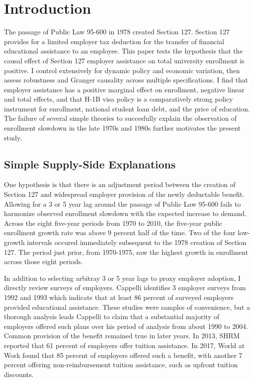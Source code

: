 \documentclass[review]{elsarticle}
\begin{document}
\pagebreak
\linenumbers

\section{Introduction}
The passage of Public Law 95-600 in 1978 created Section 127\cite{plaw95_600_1978}.
Section 127 provides for a limited employer tax deduction for the transfer of financial educational assistance to an employee.
This paper tests the hypothesis that the causal effect of Section 127 employer assistance on total university enrollment is positive.
I control extensively for dynamic policy and economic variation, then assess robustness and Granger causality across multiple specifications.
I find that employer assistance has a positive marginal effect on enrollment,
negative linear and total effects,
and that H-1B visa policy is a comparatively strong policy instrument for enrollment,
national student loan debt, and the price of education.
The failure of several simple theories to succesfully explain the observation of enrollment slowdown in the late 1970s and 1980s further motivates the present study.

\subsection{Simple Supply-Side Explanations}
One hypothesis is that there is an adjustment period between the creation of Section 127 and widespread employer provision of the newly deductable benefit.
Allowing for a 3 or 5 year lag around the passage of Public Law 95-600 fails to harmonize observed enrollment slowdown with the expected increase to demand.
Across the eight five-year periods from 1970 to 2010, the five-year public enrollment growth rate was above 9 percent half of the time.
Two of the four low-growth intervals occured immediately subsequent to the 1978 creation of Section 127.
The period just prior, from 1970-1975, saw the highest growth in enrollment across those eight periods.

In addition to selecting arbitray 3 or 5 year lags to proxy employer adoption, I directly review surveys of employers.
Cappelli\cite{cappelli2004employers} identifies 3 employer surveys from 1992 and 1993 which indicate that at least 86 percent of surveyed employers provided educational assistance.
These studies were samples of convenience,
but a thorough analysis leads Cappelli to claim that a substantial majority of employers offered such plans over his period of analysis from about 1990 to 2004.
Common provision of the benefit remained true in later years.
In 2013, SHRM reported that 61 percent of employers offer tuition assistance\cite{cherry2014rejuvenating}.
In 2017, World at Work found that 85 percent of employers offered such a benefit,
with another 7 percent offering non-reimbursement tuition assistance, such as upfront tuition discounts\cite{talentculture_2018}.
\end{document}
